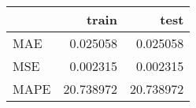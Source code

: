 \begin{tabular}{lrr}
\toprule
{} &      train &       test \\
\midrule
MAE  &   0.025058 &   0.025058 \\
MSE  &   0.002315 &   0.002315 \\
MAPE &  20.738972 &  20.738972 \\
\bottomrule
\end{tabular}
